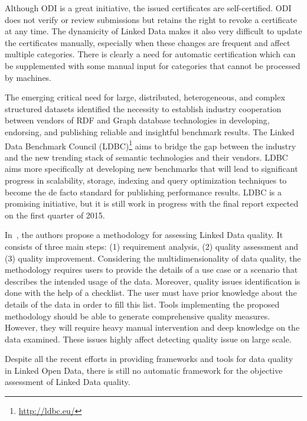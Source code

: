 Although ODI is a great initiative, the issued certificates are self-certified. ODI does not verify or review submissions but retains the right to revoke a certificate at any time. The dynamicity of Linked Data  makes it also very difficult to update the certificates manually, especially when these changes are frequent and affect multiple categories. There is clearly a need for automatic certification which can be supplemented with some manual input for categories that cannot be processed by machines.

The emerging critical need for large, distributed, heterogeneous, and complex structured datasets identified the necessity to establish industry cooperation between vendors of RDF and Graph database technologies in developing, endorsing, and publishing reliable and insightful benchmark results. The Linked Data Benchmark Council (LDBC)\footnote{\url{http://ldbc.eu/}} aims to bridge the gap between the industry and the new trending stack of semantic technologies and their vendors. LDBC aims more specifically at developing new benchmarks that will lead to significant progress in scalability, storage, indexing and query optimization techniques to become the de facto standard for publishing performance results. LDBC is a promising initiative, but it is still work in progress with the final report expected on the first quarter of 2015.

In~\cite{Anisa:LDQ:14}, the authors propose a methodology for assessing Linked Data quality. It consists of three main steps: (1) requirement analysis, (2) quality assessment and (3) quality improvement. Considering the multidimensionality of data quality, the methodology requires users to provide the details of a use case or a scenario that describes the intended usage of the data. Moreover, quality issues identification is done with the help of a checklist. The user must have prior knowledge about the details of the data in order to fill this list. Tools implementing the proposed methodology should be able to generate comprehensive quality measures. However, they will require heavy manual intervention and deep knowledge on the data examined. These issues highly affect detecting quality issue on large scale.

Despite all the recent efforts in providing frameworks and tools for data quality in Linked Open Data, there is still no automatic framework for the objective assessment of Linked Data quality.


